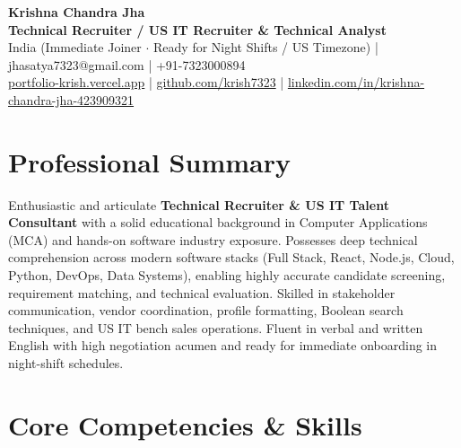 \documentclass[a4paper,10pt]{article}
\begin{document}
\begin{center}

    {\LARGE \textbf{Krishna Chandra Jha}} \\[2.5pt]

    \textbf{Technical Recruiter / US IT Recruiter \& Technical Analyst} \\[3.5pt]

    India (Immediate Joiner $\cdot$ Ready for Night Shifts / US Timezone)
    \quad | \quad
    jhasatya7323@gmail.com
    \quad | \quad
    +91-7323000894
    \\[2.5pt]

    \href{https://portfolio-ashen-alpha-dv0whhsamo.vercel.app/}{portfolio-krish.vercel.app}
    \quad | \quad
    \href{https://github.com/krish7323}{github.com/krish7323}
    \quad | \quad
    \href{https://linkedin.com/in/krishna-chandra-jha-423909321}
    {linkedin.com/in/krishna-chandra-jha-423909321}

\end{center}

\section*{Professional Summary}

Enthusiastic and articulate \textbf{Technical Recruiter \& US IT Talent Consultant} with a solid educational background in Computer Applications (MCA) and hands-on software industry exposure. Possesses deep technical comprehension across modern software stacks (Full Stack, React, Node.js, Cloud, Python, DevOps, Data Systems), enabling highly accurate candidate screening, requirement matching, and technical evaluation. Skilled in stakeholder communication, vendor coordination, profile formatting, Boolean search techniques, and US IT bench sales operations. Fluent in verbal and written English with high negotiation acumen and ready for immediate onboarding in night-shift schedules.

\section*{Core Competencies \& Skills}
\end{document}
